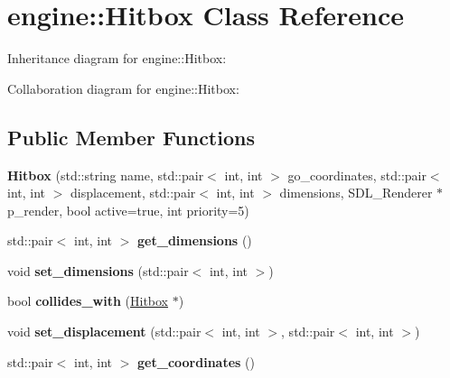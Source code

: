 \hypertarget{classengine_1_1_hitbox}{}\section{engine\+:\+:Hitbox Class Reference}
\label{classengine_1_1_hitbox}


Inheritance diagram for engine\+:\+:Hitbox\+:


Collaboration diagram for engine\+:\+:Hitbox\+:
\subsection*{Public Member Functions}
\begin{DoxyCompactItemize}
\item 
{\bfseries Hitbox} (std\+::string name, std\+::pair$<$ int, int $>$ go\+\_\+coordinates, std\+::pair$<$ int, int $>$ displacement, std\+::pair$<$ int, int $>$ dimensions, S\+D\+L\+\_\+\+Renderer $\ast$p\+\_\+render, bool active=true, int priority=5)\hypertarget{classengine_1_1_hitbox_a5900c5e7899ab60e3c9f388bdf3d6a1a}{}\label{classengine_1_1_hitbox_a5900c5e7899ab60e3c9f388bdf3d6a1a}

\item 
std\+::pair$<$ int, int $>$ {\bfseries get\+\_\+dimensions} ()\hypertarget{classengine_1_1_hitbox_a6383a8d5f77c30dde5fac8f3d3089504}{}\label{classengine_1_1_hitbox_a6383a8d5f77c30dde5fac8f3d3089504}

\item 
void {\bfseries set\+\_\+dimensions} (std\+::pair$<$ int, int $>$)\hypertarget{classengine_1_1_hitbox_add67edc1c8aefeb1379ce5083c518993}{}\label{classengine_1_1_hitbox_add67edc1c8aefeb1379ce5083c518993}

\item 
bool {\bfseries collides\+\_\+with} (\hyperlink{classengine_1_1_hitbox}{Hitbox} $\ast$)\hypertarget{classengine_1_1_hitbox_ab3528c88c18c2b671a5b7b39d0bb9fdf}{}\label{classengine_1_1_hitbox_ab3528c88c18c2b671a5b7b39d0bb9fdf}

\item 
void {\bfseries set\+\_\+displacement} (std\+::pair$<$ int, int $>$, std\+::pair$<$ int, int $>$)\hypertarget{classengine_1_1_hitbox_a61fef55605a99e6b5df28a63aa131609}{}\label{classengine_1_1_hitbox_a61fef55605a99e6b5df28a63aa131609}

\item 
std\+::pair$<$ int, int $>$ {\bfseries get\+\_\+coordinates} ()\hypertarget{classengine_1_1_hitbox_a7731c305c7a9c9a56b609e7b89d11cb2}{}\label{classengine_1_1_hitbox_a7731c305c7a9c9a56b609e7b89d11cb2}


\end{DoxyCompactItemize}
